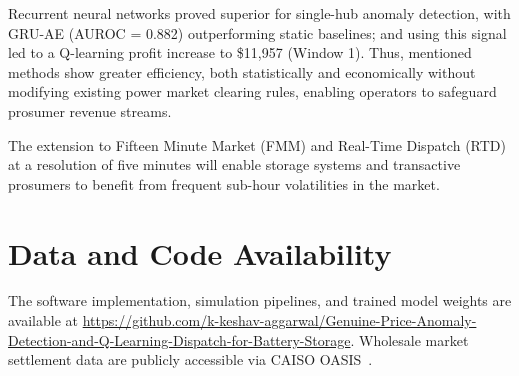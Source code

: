 \documentclass[journal]{IEEEtran}
\begin{document}


Recurrent neural networks proved superior for single-hub anomaly detection, with GRU-AE (AUROC = 0.882) outperforming static baselines; and using this signal led to a Q-learning profit increase to \$11,957 (Window 1). 
Thus, mentioned methods show greater efficiency, both statistically and economically without modifying existing power market clearing rules, enabling operators to safeguard prosumer revenue streams. 

The extension to Fifteen Minute Market (FMM) and Real-Time Dispatch (RTD) at a resolution of five minutes will enable storage systems and transactive prosumers to benefit from frequent sub-hour volatilities in the market.

\section*{Data and Code Availability}
The software implementation, simulation pipelines, and trained model weights are available at \url{https://github.com/k-keshav-aggarwal/Genuine-Price-Anomaly-Detection-and-Q-Learning-Dispatch-for-Battery-Storage}. Wholesale market settlement data are publicly accessible via CAISO OASIS~\cite{CAISO}.



\end{document}
